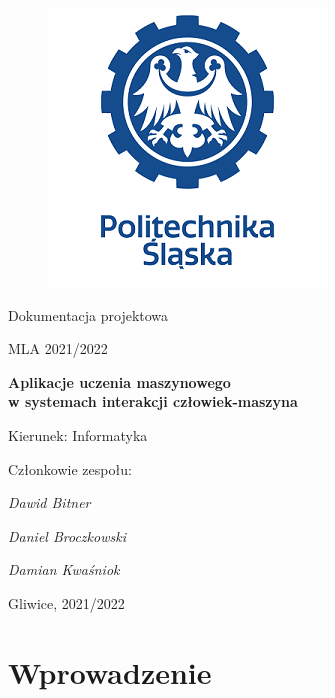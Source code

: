 \documentclass[12pt,a4paper]{article}
\begin{document}
\nocite{*}

\clearpage
\begin{figure}[h]
\centering
\includegraphics{media/ps-logo.png}
\end{figure}
\hspace{3cm}
\begin{center}Dokumentacja projektowa\end{center}
\begin{center}MLA 2021/2022\end{center}
\hspace{3cm}
\begin{center}\large\textbf{Aplikacje uczenia maszynowego \\w systemach interakcji człowiek-maszyna}\end{center}
\hspace{7cm}
\begin{flushright}Kierunek: Informatyka
\end{flushright}
\begin{flushright}Członkowie zespołu:
\par
\textit{Dawid Bitner}
\par
\textit{Daniel Broczkowski}
\par
\textit{Damian Kwaśniok}
\end{flushright}
\vfill
\begin{center}Gliwice, 2021/2022\end{center}

\newpage
{}
\tableofcontents

\newpage
\section{Wprowadzenie}
\end{document}
